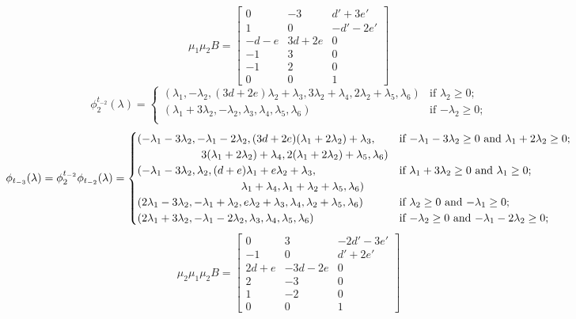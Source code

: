 \documentclass{amsart}
\numberwithin{theorem}{section}
\begin{document}
  \[
    \mu_1\mu_2 B=\left[\begin{array}{ccc} 
    0 & -3 & d'+3e' \\ 
    1 & 0 & -d'-2e'\\ 
    -d-e & 3d+2e & 0\\ 
    -1 & 3 & 0\\ 
    -1 & 2 & 0\\ 
    0 & 0 & 1
    \end{array}\right]
  \]
  \[
    \phi^{t_{-2}}_2(\lambda)
    =
    \begin{cases} 
      (\lambda_1,-\lambda_2,(3d+2e)\lambda_2+\lambda_3,3\lambda_2+\lambda_4,2\lambda_2+\lambda_5,\lambda_6) & \text{if $\lambda_2 \ge 0$;}\\
      (\lambda_1+3\lambda_2,-\lambda_2,\lambda_3,\lambda_4,\lambda_5,\lambda_6) & \text{if $-\lambda_2 \ge 0$;}\\
    \end{cases}
  \]
  \[
    \phi_{t_{-3}}(\lambda)=\phi^{t_{-2}}_2\phi_{t_{-2}}(\lambda)
    =
    \begin{cases}
      (-\lambda_1-3\lambda_2,-\lambda_1-2\lambda_2,(3d+2e)(\lambda_1+2\lambda_2)+\lambda_3, & \text{if $-\lambda_1-3\lambda_2 \ge 0$ and $\lambda_1+2\lambda_2 \ge 0$;}\\
      \hspace{0.8in} 3(\lambda_1+2\lambda_2)+\lambda_4,2(\lambda_1+2\lambda_2)+\lambda_5,\lambda_6) & \\
      (-\lambda_1-3\lambda_2,\lambda_2,(d+e)\lambda_1+e\lambda_2+\lambda_3, & \text{if $\lambda_1+3\lambda_2 \ge 0$ and $\lambda_1 \ge 0$;}\\
      \hspace{1.3in} \lambda_1+\lambda_4,\lambda_1+\lambda_2+\lambda_5,\lambda_6) & \\
      (2\lambda_1-3\lambda_2,-\lambda_1+\lambda_2,e\lambda_2+\lambda_3,\lambda_4,\lambda_2+\lambda_5,\lambda_6) & \text{if $\lambda_2 \ge 0$ and $-\lambda_1 \ge 0$;}\\
      (2\lambda_1+3\lambda_2,-\lambda_1-2\lambda_2,\lambda_3,\lambda_4,\lambda_5,\lambda_6) & \text{if $-\lambda_2 \ge 0$ and $-\lambda_1-2\lambda_2 \ge 0$;}\\
    \end{cases}
  \]
  \[
    \mu_2\mu_1\mu_2 B=\left[\begin{array}{ccc} 
    0 & 3 & -2d'-3e' \\ 
    -1 & 0 & d'+2e'\\ 
    2d+e & -3d-2e & 0\\ 
    2 & -3 & 0\\ 
    1 & -2 & 0\\ 
    0 & 0 & 1
    \end{array}\right]
  \]
\end{document}
